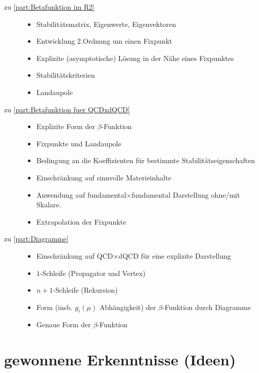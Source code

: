 \begin{description}
		\item[zu \ref{part:Betafunktion im R2}]
			\begin{itemize}
				\item	Stabilitätsmatrix, Eigenwerte, 
						Eigenvektoren
				\item	Entwicklung 2.Ordnung um einen 
						Fixpunkt
				\item	Explizite (asymptotische) Lösung in der 
						Nähe eines Fixpunktes
				\item 	Stabilitätskriterien
				\item	Landaupole
			\end{itemize}
			
		\item[zu \ref{part:Betafunktion fuer QCDxdQCD}]
			\begin{itemize}
				\item	Explizite Form der $\beta$-Funktion
				\item	Fixpunkte und Landaupole
				\item	Bedingung an die Koeffizienten für 
						bestimmte Stabilitätseigenschaften
				\item 	Einschränkung auf sinnvolle 
						Materieinhalte
				\item	Anwendung auf fundamental$\times$fundamental 
						Darstellung ohne/mit Skalare.
				\item 	Extrapolation der Fixpunkte
			\end{itemize}				
			
			
		\item[zu \ref{part:Diagramme}]
			\begin{itemize}
				\item	Einschränkung auf QCD$\times$dQCD für 
						eine explizite Darstellung
				\item	$1$-Schleife (Propagator und Vertex)
				\item	$n+1$-Schleife (Rekursion)
				\item	Form (insb. $g_i(\mu)$ Abhängigkeit) der 
						$\beta$-Funktion durch Diagramme
				\item 	Genaue Form der $\beta$-Funktion
			\end{itemize}
		
		
			
	\end{description}




\clearpage
\section{gewonnene Erkenntnisse (Ideen)}

